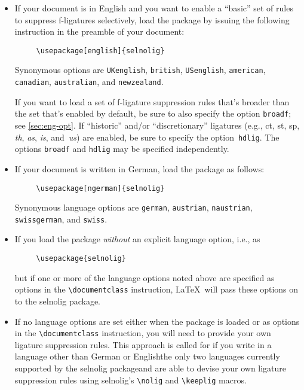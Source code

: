 \documentclass[11pt]{article}
\newcommand{\pkg}[1]{\textsf{#1}}
\newcommand{\opt}[1]{\texttt{#1}}
\newcommand{\cmmd}[1]{\texttt{\textbackslash #1}}
\begin{document}
\begin{itemize}
\item If your document is in English and you want to enable a \enquote{basic} set of rules to suppress f-ligatures selectively, load the package by issuing the following instruction in the preamble of your document:
\begin{Verbatim}
     \usepackage[english]{selnolig}
\end{Verbatim}
Synonymous options are \opt{UKenglish}, \opt{british}, \opt{USenglish}, \opt{american}, \opt{cana\-dian}, \opt{australian}, and \opt{new\-zea\-land}.

If you want to load a set of f-ligature suppression rules that's broader than the set that's enabled by default, be sure to also specify the option \opt{broadf}; see \cref{sec:eng-opt}. If \enquote{historic} and/or \enquote{discretionary} ligatures (e.g., ct, st, sp, \emph{th}, \emph{as}, \emph{is}, and~\emph{us}) are enabled, be sure to specify the option~\opt{hdlig}. The options \opt{broadf} and \opt{hdlig} may be specified independently.

\item If your document is written in German, load the package as follows:
\begin{Verbatim}
     \usepackage[ngerman]{selnolig}
\end{Verbatim}
Synonymous language options are \opt{german}, \opt{austrian}, \opt{naustrian}, \opt{swissgerman}, and \opt{swiss}.

\item If you load the package \emph{without} an explicit language option, i.e., as
\begin{Verbatim}
     \usepackage{selnolig}
\end{Verbatim}
but if one or more of the language options noted above are specified as options in the \cmmd{documentclass} instruction, \LaTeX\ will pass these options on to the \pkg{selnolig} package.

\item If no language options are set either when the package is loaded or as options in the \cmmd{documentclass} instruction, you will need to provide your own ligature suppression rules. This approach is called for if you write in a language other than German or English\textemdash the only two languages currently supported by the \pkg{selnolig} package\textemdash and are able to devise your own ligature suppression rules using \pkg{selnolig}'s \cmmd{nolig} and \cmmd{keeplig} macros.

\end{itemize}
\end{document}
